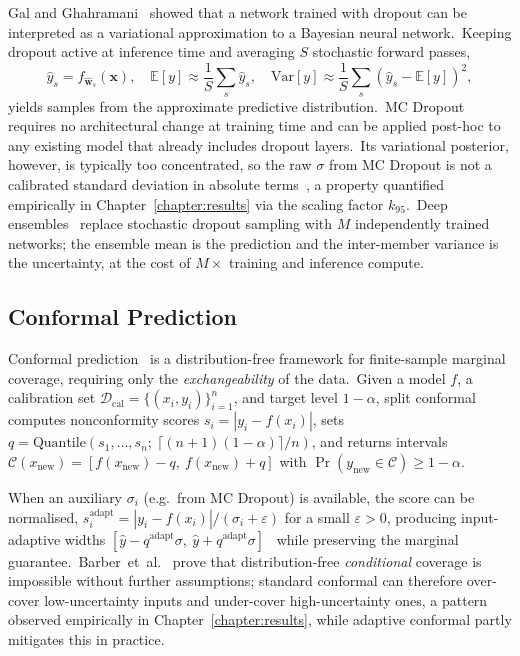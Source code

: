 Gal and Ghahramani~\cite{gal2016dropout} showed that a network trained with dropout can be interpreted as a variational approximation to a Bayesian neural network.\ Keeping dropout active at inference time and averaging $S$ stochastic forward passes,
\begin{equation}
 \hat{y}_s = f_{\hat{\mathbf{w}}_s}(\mathbf{x}), \quad
 \mathbb{E}[y] \approx \frac{1}{S}\sum_s \hat{y}_s, \quad
 \mathrm{Var}[y] \approx \frac{1}{S}\sum_s (\hat{y}_s - \mathbb{E}[y])^2,
\end{equation}
yields samples from the approximate predictive distribution.\ MC Dropout requires no architectural change at training time and can be applied post-hoc to any existing model that already includes dropout layers.\ Its variational posterior, however, is typically too concentrated, so the raw $\sigma$ from MC Dropout is not a calibrated standard deviation in absolute terms~\cite{foong2019between}, a property quantified empirically in Chapter~\ref{chapter:results} via the scaling factor $k_{95}$.\ Deep ensembles~\cite{lakshminarayanan2017simple} replace stochastic dropout sampling with $M$ independently trained networks; the ensemble mean is the prediction and the inter-member variance is the uncertainty, at the cost of $M\times$ training and inference compute.

\subsection{Conformal Prediction}\label{sec:conformal_bg}

Conformal prediction~\cite{vovk2005algorithmic,angelopoulos2023conformal} is a distribution-free framework for finite-sample marginal coverage, requiring only the \emph{exchangeability} of the data.\ Given a model $f$, a calibration set $\mathcal{D}_\text{cal} = \{(x_i, y_i)\}_{i=1}^{n}$, and target level $1-\alpha$, split conformal computes nonconformity scores $s_i = |y_i - f(x_i)|$, sets $q = \mathrm{Quantile}(s_1, \dots, s_n;\ \lceil (n+1)(1-\alpha) \rceil / n)$, and returns intervals $\mathcal{C}(x_\text{new}) = [f(x_\text{new}) - q,\ f(x_\text{new}) + q]$ with $\Pr(y_\text{new} \in \mathcal{C}) \geq 1-\alpha$.

When an auxiliary $\sigma_i$ (e.g.~from MC Dropout) is available, the score can be normalised, $s_i^\text{adapt} = |y_i - f(x_i)|/(\sigma_i + \varepsilon)$ for a small $\varepsilon > 0$, producing input-adaptive widths $[\hat y - q^\text{adapt}\sigma,\ \hat y + q^\text{adapt}\sigma]$~\cite{romano2019conformalized} while preserving the marginal guarantee.\ Barber~et~al.~\cite{barber2021limits} prove that distribution-free \emph{conditional} coverage is impossible without further assumptions; standard conformal can therefore over-cover low-uncertainty inputs and under-cover high-uncertainty ones, a pattern observed empirically in Chapter~\ref{chapter:results}, while adaptive conformal partly mitigates this in practice.

